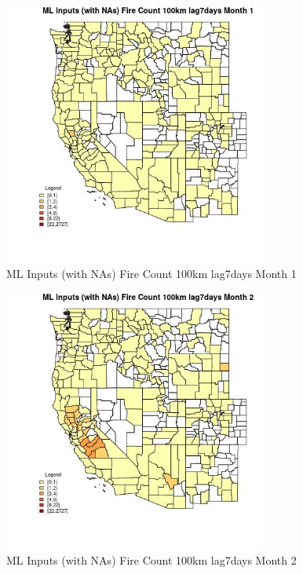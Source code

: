 \clearpage 

\begin{figure} 
\centering  
\includegraphics[width=0.77\textwidth]{Code_Outputs/Report_ML_input_PM25_Step4_part_f_de_duplicated_aveswNAs_CountyFire_Count_100km_lag7daysmedianMonth1.jpg} 
\caption{\label{fig:Report_ML_input_PM25_Step4_part_f_de_duplicated_aveswNAsCountyFire_Count_100km_lag7daysmedianMonth1}ML Inputs (with NAs) Fire Count 100km lag7days Month 1} 
\end{figure} 
 

\begin{figure} 
\centering  
\includegraphics[width=0.77\textwidth]{Code_Outputs/Report_ML_input_PM25_Step4_part_f_de_duplicated_aveswNAs_CountyFire_Count_100km_lag7daysmedianMonth2.jpg} 
\caption{\label{fig:Report_ML_input_PM25_Step4_part_f_de_duplicated_aveswNAsCountyFire_Count_100km_lag7daysmedianMonth2}ML Inputs (with NAs) Fire Count 100km lag7days Month 2} 
\end{figure} 
 

